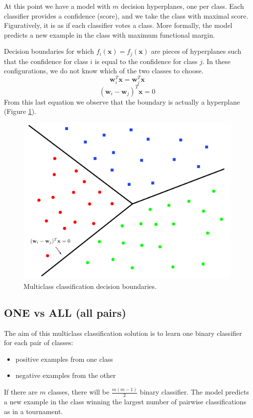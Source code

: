 At this point we have a model with $m$ decision hyperplanes, one per class. Each classifier provides a confidence (score), and we take the class with maximal score. Figuratively, it is as if each classifier votes a class. More formally, the model predicts a new example in the class with maximum functional margin. \newline

Decision boundaries for which $f_i(\pmb{x}) = f_j(\pmb{x})$ are pieces of hyperplanes such that the confidence for class $i$ is equal to the confidence for class $j$. In these configurations, we do not know which of the two classes to choose.
$$\pmb{w}_i^T \pmb{x} = \pmb{w}_j^T \pmb{x}$$
$$(\pmb{w}_i - \pmb{w}_j)^T \pmb{x} = 0$$
From this last equation we observe that the boundary is actually a hyperplane (Figure \ref{fig:oneVsAllMulticlassClassification}).

\begin{figure}
    \centering
    \includegraphics[scale=0.3]{images/oneVsAllMulticlassClassification.png}
    \caption{Multiclass classification decision boundaries.}
    \label{fig:oneVsAllMulticlassClassification}
\end{figure}

\subsection{ONE vs ALL (all pairs)}
The aim of this multiclass classification solution is to learn one binary classifier for each pair of classes:
\begin{itemize}
    \item positive examples from one class
    \item negative examples from the other
\end{itemize}
If there are $m$ classes, there will be $\frac{m(m-1)}{2}$ binary classifier. The model predicts a new example in the class winning the largest number of pairwise classifications as in a tournament.

